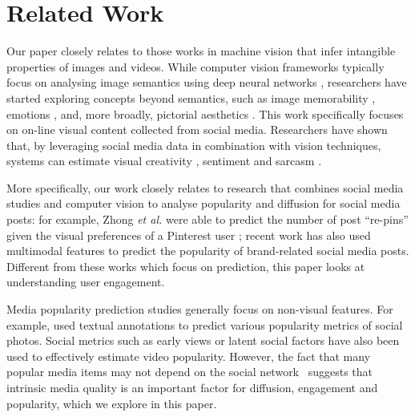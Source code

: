\section{ Related Work}
Our paper closely relates to those works  in machine vision that infer intangible properties of images and videos. While  computer vision frameworks typically focus on analysing image semantics using deep neural networks \cite{krizhevsky2012imagenet}, researchers have started exploring concepts beyond semantics, such as image memorability \cite{isola2011makes}, emotions \cite{Machajdik}, and, more broadly, pictorial aesthetics \cite{datta2008algorithmic,luo2008photo,goodSelfie}. 
This work specifically focuses on on-line visual content collected from social media. Researchers have shown that, by leveraging social media data in combination with vision techniques, systems can estimate visual creativity \cite{redi20146},  sentiment \cite{wang2015inferring,jou2015visual} and sarcasm \cite{schifanella2016detecting}. %

More specifically, our work closely relates to research that combines social media studies and computer vision to analyse popularity and diffusion for social media posts: for example, Zhong \textsl{et al.} were able to predict the number of post ``re-pins''  given the visual preferences of a Pinterest user \cite{predictingPintrest}; recent work \cite{Mazloom:2016:MPP:2964284.2967210} has also used multimodal features to predict the popularity of brand-related social media posts. Different from these works which focus on prediction,  this paper looks at understanding user engagement. 

Media popularity prediction studies generally focus on non-visual features.  For example, \cite{Yamasaki:2014} used textual annotations to predict various popularity metrics of social photos. Social metrics such as early views \cite{pinto2013using} or latent social factors \cite{nwana2013latent} have also been used to effectively estimate video popularity. However, the fact that many popular media items may not depend on the social  network~\cite{Cha2009Flickr} suggests that intrinsic media quality is an important factor for diffusion, engagement and popularity, which we explore in this paper.

